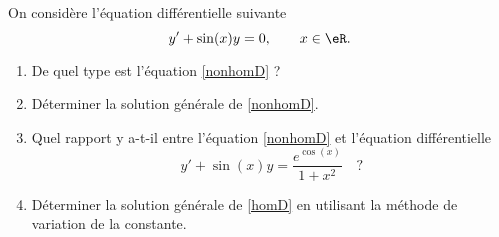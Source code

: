 
\begin{exercice}\label{exoanalyseCTU-0016}


On considère l'équation différentielle suivante
\begin{equation}\label{nonhomD}
  y' + \sin(x)y= 0, \qquad x\in\eR.
\end{equation}
\begin{enumerate}
\item De quel type est l'équation \eqref{nonhomD} ?
\item Déterminer la solution générale de \eqref{nonhomD}.
\item Quel rapport y a-t-il entre l'équation \eqref{nonhomD} et  l'équation différentielle 
  \begin{equation}\label{homD}
   y' + \sin(x)y= \frac{e^{\cos(x)}}{1+x^2} \quad ?
  \end{equation}
\item  Déterminer la solution générale de \eqref{homD} en utilisant la méthode de variation de la constante.  
\end{enumerate}


\end{exercice}
